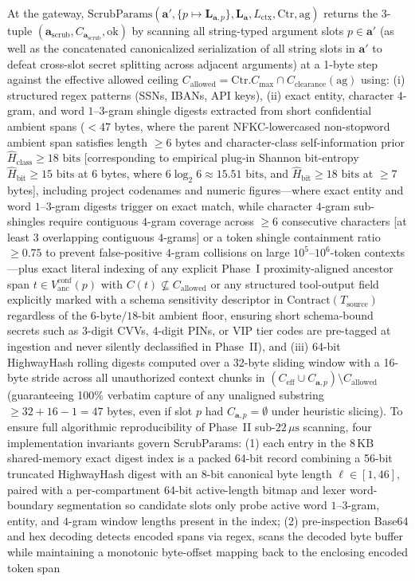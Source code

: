 \documentclass[conference,10pt]{IEEEtran}
\begin{document}
At the gateway, $\text{ScrubParams}(\mathbf{a}', \{p \mapsto \mathbf{L}_{\mathbf{a}, p}\}, \mathbf{L}_{\mathbf{a}}, L_{\text{ctx}}, \text{Ctr}, \text{ag})$ returns the 3-tuple $(\mathbf{a}_{\text{scrub}}, C_{\mathbf{a}_{\text{scrub}}}, \text{ok})$ by scanning all string-typed argument slots $p \in \mathbf{a}'$ (as well as the concatenated canonicalized serialization of all string slots in $\mathbf{a}'$ to defeat cross-slot secret splitting across adjacent arguments) at a 1-byte step against the effective allowed ceiling $C_{\text{allowed}} = \text{Ctr}.C_{\text{max}} \cap C_{\text{clearance}}(\text{ag})$ using: (i) structured regex patterns (SSNs, IBANs, API keys), (ii) exact entity, character $4$-gram, and word $1\text{--}3$-gram shingle digests extracted from short confidential ambient spans ($< 47$ bytes, where the parent NFKC-lowercased non-stopword ambient span satisfies length $\ge 6$ bytes and character-class self-information prior $\hat{H}_{\text{class}} \ge 18\text{ bits}$ [corresponding to empirical plug-in Shannon bit-entropy $\hat{H}_{\text{bit}} \ge 15\text{ bits}$ at $6$ bytes, where $6 \log_2 6 \approx 15.51\text{ bits}$, and $\hat{H}_{\text{bit}} \ge 18\text{ bits}$ at $\ge 7$ bytes], including project codenames and numeric figures---where exact entity and word $1\text{--}3$-gram digests trigger on exact match, while character $4$-gram sub-shingles require contiguous $4$-gram coverage across $\ge 6$ consecutive characters [at least $3$ overlapping contiguous $4$-grams] or a token shingle containment ratio $\ge 0.75$ to prevent false-positive $4$-gram collisions on large $10^5\text{--}10^6$-token contexts---plus exact literal indexing of any explicit Phase~I proximity-aligned ancestor span $t \in V_{\text{anc}}^{\text{conf}}(p)$ with $C(t) \not\subseteq C_{\text{allowed}}$ or any structured tool-output field explicitly marked with a schema sensitivity descriptor in $\text{Contract}(T_{\text{source}})$ regardless of the $6\text{-byte} / 18\text{-bit}$ ambient floor, ensuring short schema-bound secrets such as 3-digit CVVs, 4-digit PINs, or VIP tier codes are pre-tagged at ingestion and never silently declassified in Phase~II), and (iii) 64-bit HighwayHash rolling digests computed over a 32-byte sliding window with a 16-byte stride across all unauthorized context chunks in $(C_{\text{eff}} \cup C_{\mathbf{a}, p}) \setminus C_{\text{allowed}}$ (guaranteeing 100\% verbatim capture of any unaligned substring $\ge 32 + 16 - 1 = 47$ bytes, even if slot $p$ had $C_{\mathbf{a}, p} = \emptyset$ under heuristic slicing). To ensure full algorithmic reproducibility of Phase~II sub-$22\,\mu\text{s}$ scanning, four implementation invariants govern $\text{ScrubParams}$: (1) each entry in the $8\,\text{KB}$ shared-memory exact digest index is a packed 64-bit record combining a 56-bit truncated HighwayHash digest with an 8-bit canonical byte length $\ell \in [1, 46]$, paired with a per-compartment 64-bit active-length bitmap and lexer word-boundary segmentation so candidate slots only probe active word $1\text{--}3$-gram, entity, and $4$-gram window lengths present in the index; (2) pre-inspection Base64 and hex decoding detects encoded spans via regex, scans the decoded byte buffer while maintaining a monotonic byte-offset mapping back to the enclosing encoded token span 
\end{document}
